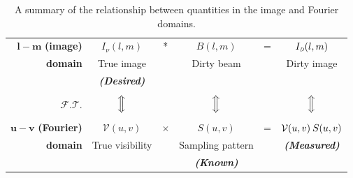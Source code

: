 \documentclass[11pt, a4paper]{article}
\newcommand{\msp}{\mkern \medmuskip}
\begin{document}
\begin{table}
  \centering
  \begin{tabular}{r|ccccc}
$\mathbf{l-m}$ \textbf{(image)}     & $I_\nu (l, m)$            & * & $B(l, m)$               & = & $I_{\mbox{\tiny{\emph{D}}}}(l, m)$ \\
\textbf{domain}                     & True image               & & Dirty beam              &   & Dirty image                       \\
                                    & \emph{\textbf{(Desired)}}& & & & \\
                                    &                          & & & & \\
              $\mathcal{F.T.}$      & $\Big \Updownarrow $     & & $\Big \Updownarrow $    &   & $\Big \Updownarrow $              \\
                                    &                          & & & & \\
$\mathbf{u-v}$ \textbf{(Fourier)}   & $\mathcal{V}(u,  v)$     & $\times $ & $S(u, v)$               & = & $\mathcal{V}(u,  v) \msp S(u, v)$ \\
      \textbf{domain}               & True visibility          & & Sampling pattern        &   & \emph{\textbf{(Measured)}}        \\
                                    &                          & & \emph{\textbf{(Known)}} &   &                                   \\
  \end{tabular}
  \caption[]{A summary of the relationship between quantities in the image and Fourier domains.}
  \label{tab:uv-summary}
\end{table}
\end{document}
